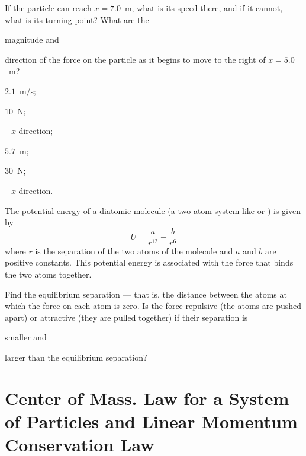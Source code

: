 \begin{problem}
\begin{enumerate*}[label=(\alph*)]
		\item If the particle can reach $x = 7.0$~m, what is its speed there, and if it cannot, what is its turning point?
		What are the
		\item magnitude and
		\item direction of the force on the particle as it begins to move to the right of $x = 5.0$~m?
	\end{enumerate*}
	\begin{solution}
		\begin{enumerate*}[label=(\alph*)]
			\item $2.1$~m/s;
			\item $10$~N;
			\item $+x$ direction;
			\item $5.7$~m;
			\item $30$~N;
			\item $-x$ direction.
		\end{enumerate*}
	\end{solution}
\end{problem}


\begin{problem}
	The potential energy of a diatomic molecule (a two-atom system like  or ) is given by 
	\[
		U = \frac{a}{r^{12}} - \frac{b}{r^6}
	\]
	where $r$ is the separation of the two atoms of the molecule and $a$ and $b$ are positive constants. This potential energy is associated with the force that binds the two atoms together.
	\begin{enumerate*}[label=(\alph*)]
		\item Find the equilibrium separation --- that is, the distance between the atoms at which the force on each atom is zero.
		Is the force repulsive (the atoms are pushed apart) or attractive (they are pulled together) if their separation is
		\item smaller and
		\item larger than the equilibrium separation?
	\end{enumerate*} 
\end{problem}


\section{Center of Mass. Law for a System of Particles and Linear Momentum Conservation Law}

